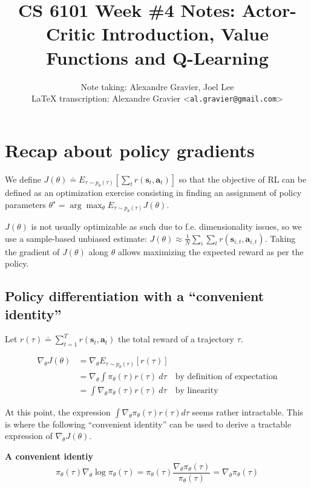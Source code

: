 \documentclass{article}
\title{CS 6101 Week \#4 Notes: Actor-Critic Introduction, Value Functions and Q-Learning}
\author{
  Note taking: Alexandre Gravier, Joel Lee\\
  \LaTeX{} transcription: Alexandre Gravier <\texttt{al.gravier@gmail.com}> \\
}
\begin{document}
\maketitle

\tableofcontents

\section{Recap about policy gradients}


We define $J(\theta) \doteq E_{\tau\sim p_\theta(\tau)}\left[\sum_t r\left(\mathbf{s}_t,\mathbf{a}_t\right)\right]$ so that the objective of RL can be defined as an optimization exercise consisting in finding an assignment of policy parameters $\theta^\star = \arg\max_\theta E_{\tau\sim p_\theta(\tau)}J(\theta)$.

$J(\theta)$ is not usually optimizable as such due to f.e. dimensionality issues, so we
use a sample-based unbiased estimate: $J(\theta) \approx \frac{1}{N} \sum_i \sum_t r\left(\mathbf{s}_{i,t},\mathbf{a}_{i,t}\right)$. Taking the gradient of $J(\theta)$ along $\theta$ allows maximizing the expected reward as per the policy.

\subsection{Policy differentiation with a ``convenient identity''}

Let $r(\tau) \doteq \sum_{t=1}^T r\left(\mathbf{s}_t,\mathbf{a}_t\right)$ the total reward of a trajectory $\tau$.

\begin{subequations}
  \begin{align}
    \nabla_\theta J(\theta) 
      &= \nabla_\theta E_{\tau\sim p_\theta(\tau)}[r(\tau)] & \\
      &= \nabla_\theta\int\pi_\theta(\tau) r(\tau)\ d\tau &\text{by definition of expectation}\\ 
      &= \int\nabla_\theta\pi_\theta(\tau) r(\tau)\ d\tau &\text{by linearity} \label{eq:gradjintegral}
  \end{align}
\end{subequations}

At this point, the expression $\int\nabla_\theta\pi_\theta(\tau) r(\tau)d\tau$ seems rather intractable. This is where the following ``convenient identity'' can be used to derive a tractable expression of $\nabla_\theta J(\theta)$.

\begin{shaded}
  \textbf{A convenient identiy}
  \begin{equation} \label{eq:convenientidentity}
    \pi_\theta (\tau)\nabla_\theta \log \pi_\theta (\tau) = \pi_\theta (\tau) \frac{\nabla_\theta \pi_\theta (\tau)}{\pi_\theta (\tau)} = \nabla_\theta \pi_\theta (\tau)
  \end{equation}
\end{shaded}
\end{document}
